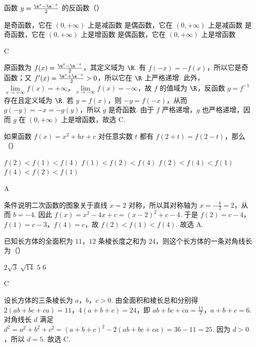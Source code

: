 \documentclass[UTF8,a4paper,oneside,11pt]{ctexbook}
\begin{document}
\begin{problem}
函数 \(y=\frac{\e^x-\e^{-x}}{2}\) 的反函数（\quad）

\choices
    {是奇函数，它在 \((0, +\infty)\) 上是减函数}
    {是偶函数，它在 \((0, +\infty)\) 上是减函数}
    {是奇函数，它在 \((0, +\infty)\) 上是增函数}
    {是偶函数，它在 \((0, +\infty)\) 上是增函数}

\begin{answer}
C
\end{answer}

\begin{solution}
原函数为 \(f(x)=\frac{\e^x-\e^{-x}}{2}\)，其定义域为 \(\R\). 有 \(f(-x)=-f(x)\)，所以它是奇函数；又 \(f'(x)=\frac{\e^x+\e^{-x}}{2}>0\)，所以它在 \(\R\) 上严格递增. 此外，\(\displaystyle\lim\limits_{x\to+\infty}f(x)=+\infty\)，\(\displaystyle\lim\limits_{x\to-\infty}f(x)=-\infty\)，故 \(f\) 的值域为 \(\R\)，反函数 \(g=f^{-1}\) 存在且定义域为 \(\R\). 若 \(y=f(x)\)，则 \(-y=f(-x)\)，从而 \(g(-y)=-x=-g(y)\)，所以 \(g\) 是奇函数. 由于 \(f\) 严格递增，\(g\) 也严格递增，因而 \(g\) 在 \((0,+\infty)\) 上是增函数，故选 C.
\end{solution}
\end{problem}

\begin{problem}
如果函数 \(f(x)=x^2+bx+c\) 对任意实数 \(t\) 都有 \(f(2+t)=f(2-t)\)，那么（\quad）

\choices
    {\(f(2) < f(1) < f(4)\)}
    {\(f(1) < f(2) < f(4)\)}
    {\(f(2) < f(4) < f(1)\)}
    {\(f(4) < f(2) < f(1)\)}

\begin{answer}
A
\end{answer}

\begin{solution}
条件说明二次函数的图象关于直线 \(x=2\) 对称，所以其对称轴为 \(x=-\frac{b}{2}=2\)，从而 \(b=-4\). 因此 \(f(x)=x^2-4x+c=(x-2)^2+c-4\). 于是 \(f(2)=c-4\)，\(f(1)=c-3\)，\(f(4)=c\)，故 \(f(2)<f(1)<f(4)\). 故选 A.
\end{solution}
\end{problem}

\begin{problem}
已知长方体的全面积为 \(11\)，\(12\) 条棱长度之和为 \(24\)，则这个长方体的一条对角线长为（\quad）

\choices
    {\(2\sqrt{3}\)}
    {\(\sqrt{14}\)}
    {\(5\)}
    {\(6\)}

\begin{answer}
C
\end{answer}

\begin{solution}
设长方体的三条棱长为 \(a\)，\(b\)，\(c>0\). 由全面积和棱长总和分别得 \(2(ab+bc+ca)=11\)，\(4(a+b+c)=24\)，即 \(ab+bc+ca=\frac{11}{2}\)，\(a+b+c=6\). 对角线长 \(d\) 满足
\(d^2=a^2+b^2+c^2=(a+b+c)^2-2(ab+bc+ca)=36-11=25\). 因为 \(d>0\)，所以 \(d=5\). 故选 C.
\end{solution}
\end{problem}
\end{document}
